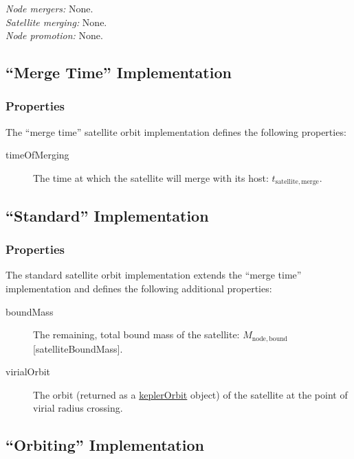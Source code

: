 \noindent\emph{Node mergers:} None.\\

\noindent\emph{Satellite merging:} None.\\

\noindent\emph{Node promotion:} None.\\

\subsection{``Merge Time'' Implementation}

\subsubsection{Properties}

The ``merge time'' satellite orbit implementation defines the following properties:
\begin{description}
 \item [{\normalfont \ttfamily timeOfMerging}] The time at which the satellite will merge with its host: $t_\mathrm{satellite, merge}$.
\end{description}

\subsection{``Standard'' Implementation}

\subsubsection{Properties}

The standard satellite orbit implementation extends the ``merge time'' implementation and defines the following additional properties:
\begin{description}
 \item [{\normalfont \ttfamily boundMass}] The remaining, total bound mass of the satellite: $M_\mathrm{node,bound}$ [{\normalfont \ttfamily satelliteBoundMass}].
 \item[{\normalfont \ttfamily virialOrbit}] The orbit (returned as a \href{https://github.com/galacticusorg/galacticus/releases/download/bleeding-edge/Galacticus_Development.pdf\#sec.KeplerOrbits}{\normalfont \ttfamily keplerOrbit} object) of the satellite at the point of virial radius crossing.
\end{description}

\subsection{``Orbiting'' Implementation}\label{sec:ComponentSatelliteOrbiting}

